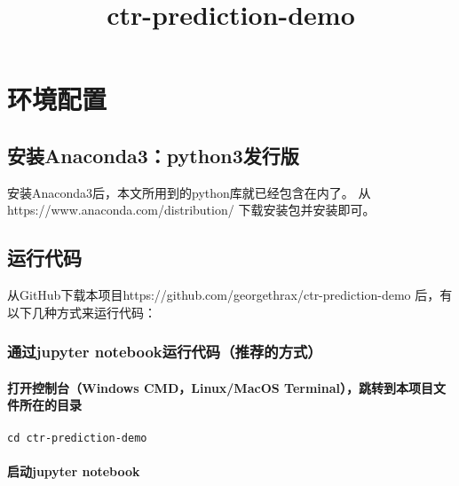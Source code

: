 \documentclass[11pt]{article}
\title{ctr-prediction-demo}
\begin{document}
    
    
    \maketitle
    
    

    
    \section{环境配置}\label{ux73afux5883ux914dux7f6e}

    \subsection{安装Anaconda3：python3发行版}\label{ux5b89ux88c5anaconda3python3ux53d1ux884cux7248}

安装Anaconda3后，本文所用到的python库就已经包含在内了。 从
https://www.anaconda.com/distribution/ 下载安装包并安装即可。

    \subsection{运行代码}\label{ux8fd0ux884cux4ee3ux7801}

从GitHub下载本项目https://github.com/georgethrax/ctr-prediction-demo
后，有以下几种方式来运行代码：

    \subsubsection{通过jupyter
notebook运行代码（推荐的方式）}\label{ux901aux8fc7jupyter-notebookux8fd0ux884cux4ee3ux7801ux63a8ux8350ux7684ux65b9ux5f0f}

\paragraph{打开控制台（Windows CMD，Linux/MacOS
Terminal），跳转到本项目文件所在的目录}\label{ux6253ux5f00ux63a7ux5236ux53f0windows-cmdlinuxmacos-terminalux8df3ux8f6cux5230ux672cux9879ux76eeux6587ux4ef6ux6240ux5728ux7684ux76eeux5f55}

\begin{verbatim}
cd ctr-prediction-demo
\end{verbatim}

\paragraph{启动jupyter notebook}\label{ux542fux52a8jupyter-notebook}
\end{document}
